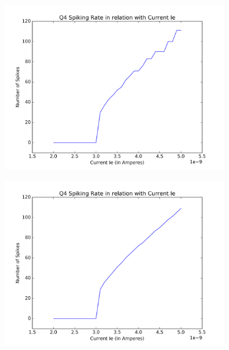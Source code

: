 \documentclass[DIV=calc, paper=a4, fontsize=12pt, twocolumn]{article}	 %
\begin{document}
        \begin{figure}[H]
			\includegraphics*[width = 9.5cm]{Q4}
		\end{figure}
		 \begin{figure}[H]
			\includegraphics*[width = 9.5cm]{Q4_extra}
		\end{figure}
\end{document}
